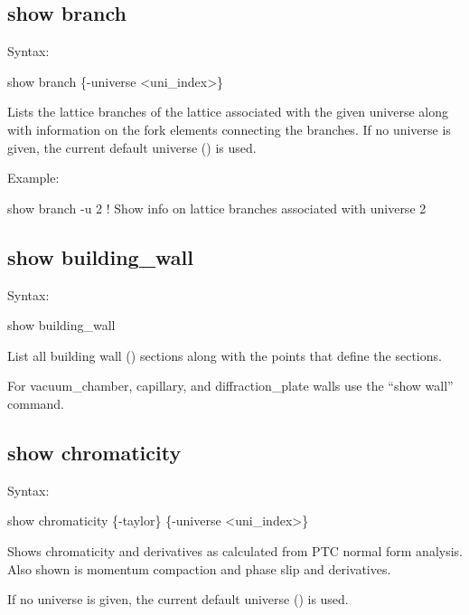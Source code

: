 {{{{{{{{{\subsection{show branch}
\label{s:show.branch}

Syntax:
\begin{example}
  show branch \{-universe <uni_index>\}
\end{example}

Lists the lattice branches of the lattice associated with the given universe along with information
on the fork elements connecting the branches.  If no universe is given, the current default universe
() is used.

Example:
\begin{example}
  show branch -u 2     ! Show info on lattice branches associated with universe 2
\end{example}


\subsection{show building_wall}
\label{s:show.building}

Syntax:
\begin{example}
  show building_wall
\end{example}

List all building wall () sections along with the points that define
the sections.

For vacuum_chamber, capillary, and diffraction_plate walls use the ``show wall'' command.


\subsection{show chromaticity}
\label{s:show.chrom}

Syntax:
\begin{example}
  show chromaticity \{-taylor\} \{-universe <uni_index>\} 
\end{example}

Shows chromaticity and derivatives as calculated from PTC normal form analysis. Also shown
is momentum compaction and phase slip and derivatives.

If no universe is given, the current default universe () is used.

}}}}}}}}}
